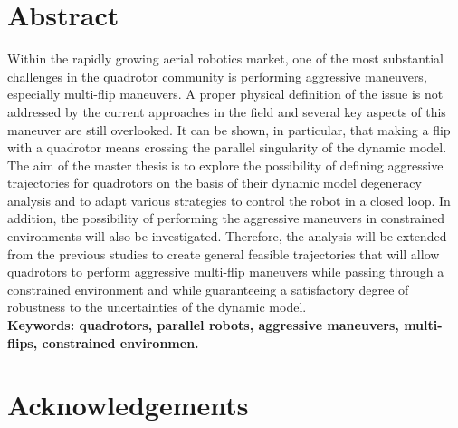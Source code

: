 \documentclass{thesisreport}
\begin{document}
   
 
  \section*{Abstract}
   
Within the rapidly growing aerial robotics market, one of the most substantial challenges in the quadrotor community is performing aggressive maneuvers, especially multi-flip maneuvers.  A proper physical definition of the issue is not addressed by the current approaches in the field and several key aspects of this maneuver are still overlooked.
It can be shown, in particular, that making a flip with a quadrotor means crossing the parallel singularity of the dynamic model. The aim of the master thesis is to explore the possibility of defining aggressive trajectories for quadrotors on the basis of their dynamic model degeneracy analysis and to adapt various strategies to control the robot in a closed loop. In addition, the possibility of performing the aggressive maneuvers in constrained environments will also be investigated.
Therefore, the analysis will be extended from the previous studies to create general feasible trajectories that will allow quadrotors to perform aggressive multi-flip maneuvers while passing through a constrained environment and while guaranteeing a satisfactory degree of robustness to the uncertainties of the dynamic model.\\

\textbf{Keywords: quadrotors, parallel robots, aggressive maneuvers, multi-flips, constrained environmen. }
 
 
 \newpage
 
 \section*{Acknowledgements}
 
\end{document}
